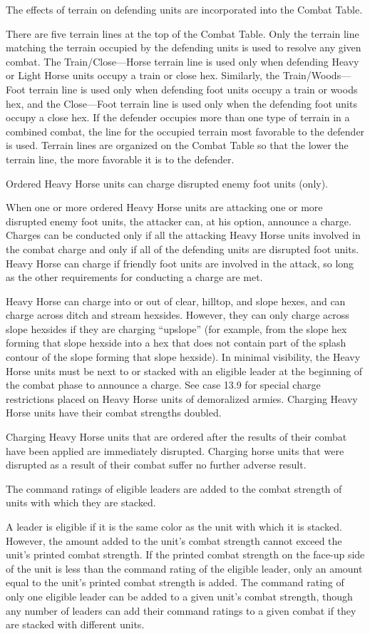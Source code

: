  The effects of terrain on defending units are incorporated into the Combat Table.

There are five terrain lines at the top of the Combat Table. Only the terrain line matching the terrain occupied by the defending units is used to resolve any given combat. The Train/Close---Horse terrain line is used only when defending Heavy or Light Horse units occupy a train or close hex. Similarly, the Train/Woods---Foot terrain line is used only when defending foot units occupy a train or woods hex, and the Close---Foot terrain line is used only when the defending foot units occupy a close hex. If the defender occupies more than one type of terrain in a combined combat, the line for the occupied terrain most favorable to the defender is used. Terrain lines are organized on the Combat Table so that the lower the terrain line, the more favorable it is to the defender.

 Ordered Heavy Horse units can charge disrupted enemy foot units (only).

When one or more ordered Heavy Horse units are attacking one or more disrupted enemy foot units, the attacker can, at his option, announce a charge. Charges can be conducted only if all the attacking Heavy Horse units involved in the combat charge and only if all of the defending units are disrupted foot units. Heavy Horse can charge if friendly foot units are involved in the attack, so long as the other requirements for conducting a charge are met.

Heavy Horse can charge into or out of clear, hilltop, and slope hexes, and can charge across ditch and stream hexsides. However, they can only charge across slope hexsides if they are charging ``upslope'' (for example, from the slope hex forming that slope hexside into a hex that does not contain part of the splash contour of the slope forming that slope hexside). In minimal visibility, the Heavy Horse units must be next to or stacked with an eligible leader at the beginning of the combat phase to announce a charge. See case 13.9 for special charge restrictions placed on Heavy Horse units of demoralized armies. Charging Heavy Horse units have their combat strengths doubled.

 Charging Heavy Horse units that are ordered after the results of their combat have been applied are immediately disrupted. Charging horse units that were disrupted as a result of their combat suffer no further adverse result.

 The command ratings of eligible leaders are added to the combat strength of units with which they are stacked.

A leader is eligible if it is the same color as the unit with which it is stacked. However, the amount added to the unit's combat strength cannot exceed the unit's printed combat strength. If the printed combat strength on the face-up side of the unit is less than the command rating of the eligible leader, only an amount equal to the unit's printed combat strength is added. The command rating of only one eligible leader can be added to a given unit's combat strength, though any number of leaders can add their command ratings to a given combat if they are stacked with different units.
